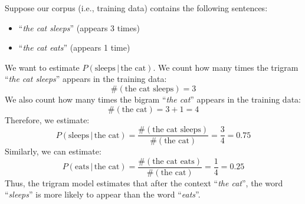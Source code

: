 \highspace
\begin{examplebox}
    Suppose our corpus (i.e., training data) contains the following sentences:
    \begin{itemize}
        \item ``\emph{the cat sleeps}'' (appears 3 times)
        \item ``\emph{the cat eats}'' (appears 1 time)
    \end{itemize}
    We want to estimate $P\left(\text{sleeps} \, | \, \text{the cat}\right)$. We count how many times the trigram ``\emph{the cat sleeps}'' appears in the training data:
    \begin{equation*}
        \#\left(\text{the cat sleeps}\right) = 3
    \end{equation*}
    We also count how many times the bigram ``\emph{the cat}'' appears in the training data:
    \begin{equation*}
        \#\left(\text{the cat}\right) = 3 + 1 = 4
    \end{equation*}
    Therefore, we estimate:
    \begin{equation*}
        P\left(\text{sleeps} \, | \, \text{the cat}\right) = \frac{\#\left(\text{the cat sleeps}\right)}{\#\left(\text{the cat}\right)} = \frac{3}{4} = 0.75
    \end{equation*}
    Similarly, we can estimate:
    \begin{equation*}
        P\left(\text{eats} \, | \, \text{the cat}\right) = \frac{\#\left(\text{the cat eats}\right)}{\#\left(\text{the cat}\right)} = \frac{1}{4} = 0.25
    \end{equation*}
    Thus, the trigram model estimates that after the context ``\emph{the cat}'', the word ``\emph{sleeps}'' is more likely to appear than the word ``\emph{eats}''.
\end{examplebox}


